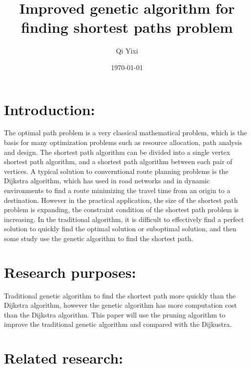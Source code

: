 \documentclass[12pt]{article}
\title{Improved genetic algorithm for finding shortest paths problem}
\author{Qi Yixi}
\date{\today}
\begin{document}
\maketitle{}
\section{Introduction:}
	The optimal path problem is a very classical mathematical problem, which is the basis for many optimization problems such as resource allocation, path analysis and design. The shortest path algorithm can be divided into a single vertex shortest path algorithm, and a shortest path algorithm between each pair of vertices. A typical solution to converntional route planning problems is the Dijkstra algorithm, which has used in road networks and in dynamic environments to find a route minimizing the travel time from an origin to a destination. However in the practical application, the size of the shortest path problem is expanding, the constraint condition of the shortest path problem is increasing. In the traditional algorithm, it is difficult to effectively find a perfect solution to quickly find the optimal solution or suboptimal solution, and then some study use the genetic algorithm to find the shortest path.
\section{Research purposes:}
Traditional genetic algorithm to find the shortest path more quickly than the Dijkstra algorithm, however the genetic algorithm has more computation cost than the Dijkstra algorithm\cite{Osaba2013}. This paper will use the pruning algorithm to improve the traditional genetic algorithm and compared with the Dijkustra.

\section{Related research:}	
\end{document}
